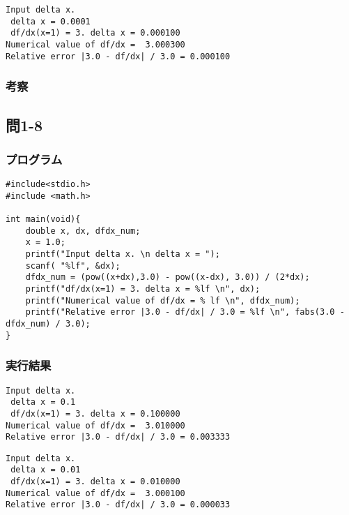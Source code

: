 \documentclass{jarticle}
\begin{document}
\begin{breakbox}
\begin{verbatim}
Input delta x. 
 delta x = 0.0001 
 df/dx(x=1) = 3. delta x = 0.000100 
Numerical value of df/dx =  3.000300 
Relative error |3.0 - df/dx| / 3.0 = 0.000100 
\end{verbatim}
\end{breakbox}
\subsubsection{考察\\}

\subsection{問1-8\\}
\subsubsection{プログラム\\}
\begin{breakbox}
\begin{verbatim}
#include<stdio.h>
#include <math.h>

int main(void){
	double x, dx, dfdx_num;
	x = 1.0;
	printf("Input delta x. \n delta x = ");
	scanf( "%lf", &dx);
  	dfdx_num = (pow((x+dx),3.0) - pow((x-dx), 3.0)) / (2*dx);	
	printf("df/dx(x=1) = 3. delta x = %lf \n", dx);
	printf("Numerical value of df/dx = % lf \n", dfdx_num);
  	printf("Relative error |3.0 - df/dx| / 3.0 = %lf \n", fabs(3.0 - dfdx_num) / 3.0);
}
\end{verbatim}
\end{breakbox}
\subsubsection{実行結果\\}
\begin{breakbox}
\begin{verbatim}
Input delta x. 
 delta x = 0.1
 df/dx(x=1) = 3. delta x = 0.100000 
Numerical value of df/dx =  3.010000 
Relative error |3.0 - df/dx| / 3.0 = 0.003333 
\end{verbatim}
\end{breakbox}

\begin{breakbox}
\begin{verbatim}
Input delta x. 
 delta x = 0.01
 df/dx(x=1) = 3. delta x = 0.010000 
Numerical value of df/dx =  3.000100 
Relative error |3.0 - df/dx| / 3.0 = 0.000033 
\end{verbatim}
\end{breakbox}
\end{document}
